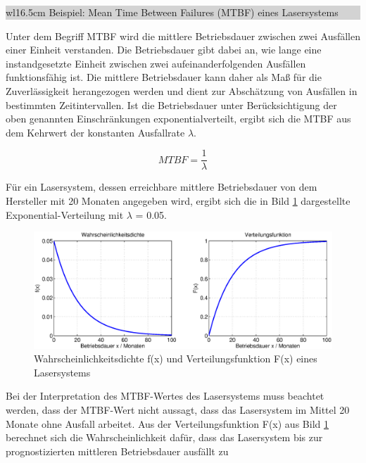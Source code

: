 \noindent
\colorbox{lightgray}{%
%
\renewcommand\arraystretch{0.6}%
\begin{tabular}{ wl{16.5cm} }
{\selectfont
\noindent
Beispiel: Mean Time Between Failures (MTBF) eines Lasersystems}
\end{tabular}%
}\bigskip

\noindent Unter dem Begriff MTBF wird die mittlere Betriebsdauer zwischen zwei Ausf\"{a}llen einer Einheit verstanden. Die Betriebsdauer gibt dabei an, wie lange eine instandgesetzte Einheit zwischen zwei aufeinanderfolgenden Ausf\"{a}llen funktionsf\"{a}hig ist. Die mittlere Betriebsdauer kann daher als Ma{\ss} f\"{u}r die Zuverl\"{a}ssigkeit herangezogen werden und dient zur Absch\"{a}tzung von Ausf\"{a}llen in bestimmten Zeitintervallen. Ist die Betriebsdauer unter Ber\"{u}cksichtigung der oben genannten Einschr\"{a}nkungen exponentialverteilt, ergibt sich die MTBF aus dem Kehrwert der konstanten Ausfallrate $\lambda$.

\begin{equation}\label{eq:fourhundredsninetynine}
MTBF=\dfrac{1}{\lambda }
\end{equation}

\noindent F\"{u}r ein Lasersystem, dessen erreichbare mittlere Betriebsdauer von dem Hersteller mit 20 Monaten angegeben wird, ergibt sich die in Bild \ref{fig:Stetig_Exponential_MTBF} dargestellte Exponential-Verteilung mit $\lambda$ = 0.05.

\begin{figure}[H]
  \centerline{\includegraphics[width=1\textwidth]{Kapitel4/Bilder/image31}}
  \caption{Wahrscheinlichkeitsdichte f(x) und Verteilungsfunktion F(x) eines Lasersystems}
  \label{fig:Stetig_Exponential_MTBF}
\end{figure}

\noindent Bei der Interpretation des MTBF-Wertes des Lasersystems muss beachtet werden, dass der MTBF-Wert nicht aussagt, dass das Lasersystem im Mittel 20 Monate ohne Ausfall arbeitet. Aus der Verteilungsfunktion F(x) aus Bild \ref{fig:Stetig_Exponential_MTBF} berechnet sich die Wahrscheinlichkeit daf\"{u}r, dass das Lasersystem bis zur prognostizierten mittleren Betriebsdauer ausf\"{a}llt zu

